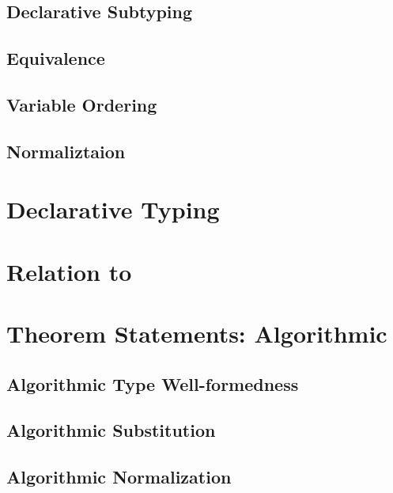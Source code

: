 \documentclass[acmsmall,natbib=false,review,anonymous]{acmart}
\newcommand{\genDir}{_gen}
\begin{document}
\subsection{Declarative Subtyping}


\subsection{Equivalence}
\label{sec:decl-equiv-statements}


\subsection{Variable Ordering}


\subsection{Normaliztaion}


\section{Declarative Typing}


\section{Relation to \systemf}


\section{Theorem Statements: Algorithmic}

\subsection{Algorithmic Type Well-formedness}


\subsection{Algorithmic Substitution}


\subsection{Algorithmic Normalization}

\end{document}

